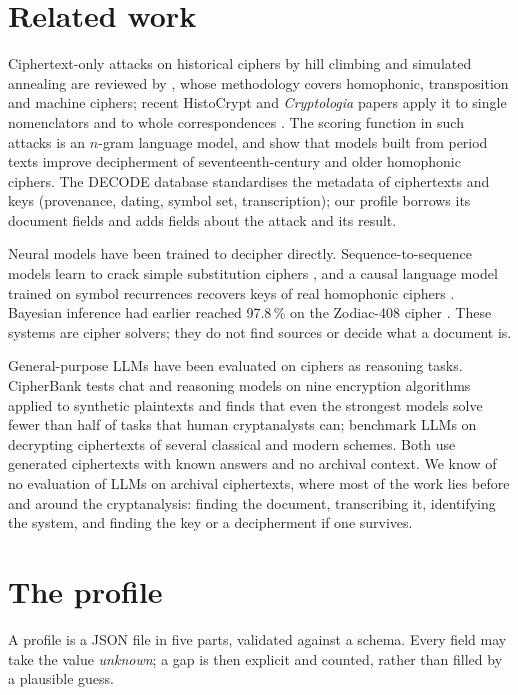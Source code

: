 \documentclass[11pt]{article}
\begin{document}
\section{Related work}

Ciphertext-only attacks on historical ciphers by hill climbing and simulated annealing are reviewed by , whose methodology covers homophonic, transposition and machine ciphers; recent HistoCrypt and \emph{Cryptologia} papers apply it to single nomenclators \cite{Lasry:2023} and to whole correspondences \cite{Lasry:2023mary}. The scoring function in such attacks is an $n$-gram language model, and  show that models built from period texts improve decipherment of seventeenth-century and older homophonic ciphers. The DECODE database \cite{Megyesi:2019,Megyesi:2020} standardises the metadata of ciphertexts and keys (provenance, dating, symbol set, transcription); our profile borrows its document fields and adds fields about the attack and its result.

Neural models have been trained to decipher directly. Sequence-to-sequence models learn to crack simple substitution ciphers \cite{Aldarrab:2021}, and a causal language model trained on symbol recurrences recovers keys of real homophonic ciphers \cite{Kambhatla:2023}. Bayesian inference had earlier reached 97.8\,\% on the Zodiac-408 cipher \cite{Ravi:2011}. These systems are cipher solvers; they do not find sources or decide what a document is.

General-purpose LLMs have been evaluated on ciphers as reasoning tasks. CipherBank \cite{Li:2025} tests chat and reasoning models on nine encryption algorithms applied to synthetic plaintexts and finds that even the strongest models solve fewer than half of tasks that human cryptanalysts can;  benchmark LLMs on decrypting ciphertexts of several classical and modern schemes. Both use generated ciphertexts with known answers and no archival context. We know of no evaluation of LLMs on archival ciphertexts, where most of the work lies before and around the cryptanalysis: finding the document, transcribing it, identifying the system, and finding the key or a decipherment if one survives.

\section{The profile}
\label{sec:schema}

A profile is a JSON file in five parts, validated against a schema. Every field may take the value \emph{unknown}; a gap is then explicit and counted, rather than filled by a plausible guess.
\end{document}
